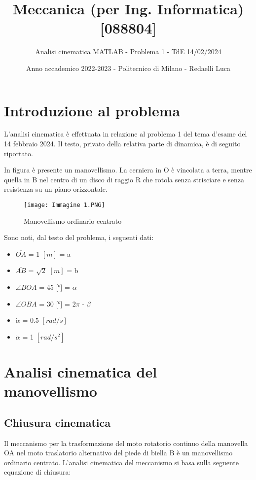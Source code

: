 \documentclass{article}
\title{Meccanica (per Ing. Informatica) [088804]}
\author{Analisi cinematica MATLAB - Problema 1 - TdE 14/02/2024}
\date{Anno accademico 2022-2023 - Politecnico di Milano - Redaelli Luca}
\begin{document}
\maketitle

\section{Introduzione al problema}

L'analisi cinematica è effettuata in relazione al problema 1 del tema d'esame del 14 febbraio 2024. 
Il testo, privato della relativa parte di dinamica, è di seguito riportato.

\bigskip

In figura è presente un manovellismo. La cerniera in O è vincolata a terra, mentre quella in B nel centro di un disco di raggio R che rotola senza strisciare e senza resistenza su un piano orizzontale.

\begin{figure}[h!]
    \centering
    \texttt{[image: Immagine 1.PNG]}
    \caption{Manovellismo ordinario centrato}
    \label{fig:1}
\end{figure}

Sono noti, dal testo del problema, i seguenti dati:

\begin{itemize}
    \item $\overline{OA}$ = 1 $[m]$ = a
    \item $\overline{AB}$ = $\sqrt{2}$ $[m]$ = b
    \item $\angle{BOA}$ = 45 [°] = $\alpha$
    \item $\angle{OBA}$ = 30 [°] = 2$\pi$ - $\beta$
    \item $\dot{\alpha}$ = 0.5 $[rad/s]$
    \item $\ddot{\alpha}$ = 1 $[rad/s^2]$
\end{itemize}

\section{Analisi cinematica del manovellismo}
\subsection{Chiusura cinematica}
Il meccanismo per la trasformazione del moto rotatorio continuo della manovella OA nel moto traslatorio alternativo del piede di biella B è un manovellismo ordinario centrato. L’analisi cinematica del meccanismo si basa sulla seguente equazione di chiusura:
\end{document}
